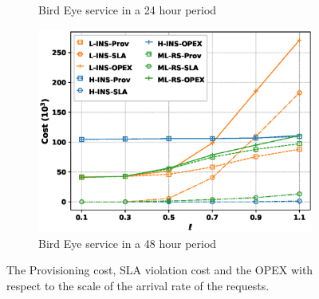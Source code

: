 \documentclass[conference, final]{IEEEtran}
\begin{document}
{\begin{figure}
\begin{subfigure}[h]{0.32\linewidth}
\caption{Bird Eye service in a 24 hour period}
\end{subfigure}
\hfill
\begin{subfigure}[h]{0.32\linewidth}
\includegraphics[width=\linewidth]{./figures/bird_eye-2days.eps}
\caption{Bird Eye service in a 48 hour period}
\end{subfigure}
\caption{The Provisioning cost, SLA violation cost and the OPEX with respect to the scale of the arrival rate of the requests.}
\label{fig:opex}
\end{figure}

}
\end{document}
